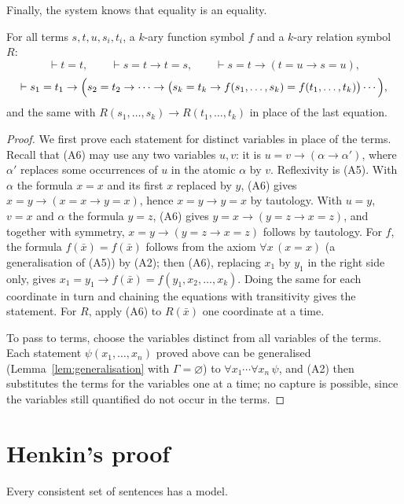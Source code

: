 Finally, the system knows that equality is an equality.

\begin{lemma}[equality]\label{lem:equality}
For all terms $s,t,u,s_i,t_i$, a $k$-ary function symbol $f$ and a $k$-ary relation symbol $R$:
\[
\vdash t=t,\qquad\vdash s=t\to t=s,\qquad\vdash s=t\to(t=u\to s=u),
\]
\[
\vdash s_1=t_1\to\Bigl(s_2=t_2\to\cdots\to\bigl(s_k=t_k\to f(s_1,\dots,s_k)=f(t_1,\dots,t_k)\bigr)\cdots\Bigr),
\]
and the same with $R(s_1,\dots,s_k)\to R(t_1,\dots,t_k)$ in place of the last equation.
\end{lemma}

\begin{proof}
We first prove each statement for distinct variables in place of the terms. Recall that (A6) may use any two variables $u,v$: it is $u=v\to(\alpha\to\alpha')$, where $\alpha'$ replaces some occurrences of $u$ in the atomic $\alpha$ by $v$. Reflexivity is (A5). With $\alpha$ the formula $x=x$ and its first $x$ replaced by $y$, (A6) gives $x=y\to(x=x\to y=x)$, hence $x=y\to y=x$ by tautology. With $u=y$, $v=x$ and $\alpha$ the formula $y=z$, (A6) gives $y=x\to(y=z\to x=z)$, and together with symmetry, $x=y\to(y=z\to x=z)$ follows by tautology. For $f$, the formula $f(\bar x)=f(\bar x)$ follows from the axiom $\forall x\,(x=x)$ (a generalisation of (A5)) by (A2); then (A6), replacing $x_1$ by $y_1$ in the right side only, gives $x_1=y_1\to f(\bar x)=f(y_1,x_2,\dots,x_k)$. Doing the same for each coordinate in turn and chaining the equations with transitivity gives the statement. For $R$, apply (A6) to $R(\bar x)$ one coordinate at a time.

To pass to terms, choose the variables distinct from all variables of the terms. Each statement $\psi(x_1,\dots,x_n)$ proved above can be generalised (Lemma~\ref{lem:generalisation} with $\Gamma=\varnothing$) to $\forall x_1\cdots\forall x_n\,\psi$, and (A2) then substitutes the terms for the variables one at a time; no capture is possible, since the variables still quantified do not occur in the terms.
\end{proof}

\section{Henkin's proof}\label{sec:henkin}

\begin{theorem}\label{thm:completeness}
Every consistent set of sentences has a model.
\end{theorem}

